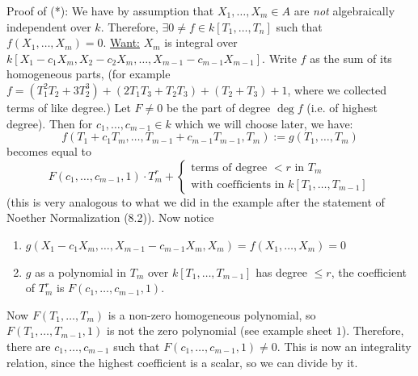 \documentclass{article}
\begin{document}
Proof of (*): We have by assumption that $X_{1}, \dots, X_{m} \in A$ are \textit{not} algebraically independent over $k$. Therefore, $\exists 0 \neq f \in k[T_{1},\dots, T_{n}]$ such that $f(X_{1}, \dots, X_{m})=0$.\gap 
\underline{Want:} $X_{m}$ is integral over $k[X_{1}-c_{1}X_{m}, X_{2}-c_{2}X_{m}, \dots, X_{m-1}-c_{m-1}X_{m-1}]$. \gap Write $f$ as the sum of its homogeneous parts, \gap (for example $f = (T_{1}^{2}T_{2} +3T_{2}^{3}) + (2T_{1}T_{3} + T_{2}T_{3}) + (T_{2} + T_{3}) + 1$, where we collected terms of like degree.) \gap
Let $F \neq 0$ be the part of degree $\deg f$ (i.e. of highest degree). Then for $c_{1}, \dots, c_{m-1} \in k$ which we will choose later, we have: \[ f(T_{1} + c_{1}T_{m}, \dots, T_{m-1} + c_{m-1}T_{m-1},T_{m}) := g(T_{1},\dots, T_{m})\]
becomes equal to \[ F(c_{1}, \dots, c_{m-1},1) \cdot T_{m}^{r} + \begin{cases}\text{terms of degree $<r$ in $T_{m}$}\\ \text{with coefficients in $k[T_{1}, \dots, T_{m-1}]$} \end{cases} \]
(this is very analogous to what we did in the example after the statement of Noether Normalization (8.2)). Now notice \begin{enumerate}
    \item $g(X_{1}-c_{1}X_{m}, \dots, X_{m-1}-c_{m-1}X_{m},X_{m}) = f(X_{1}, \dots, X_{m})=0$
    \item $g$ as a polynomial in $T_{m}$ over $k[T_{1}, \dots, T_{m-1}]$ has degree $\leq r$, the coefficient of $T_{m}^{r}$ is $F(c_{1},\dots, c_{m-1},1)$.
\end{enumerate}
Now $F(T_{1}, \dots, T_{m})$ is a non-zero homogeneous polynomial, so $F(T_{1}, \dots, T_{m-1},1)$ is not the zero polynomial (see example sheet $1$). Therefore, there are $c_{1}, \dots, c_{m-1}$ such that $F(c_{1}, \dots, c_{m-1},1) \neq 0$. This is now an integrality relation, since the highest coefficient is a scalar, so we can divide by it. \endproof
\end{document}
